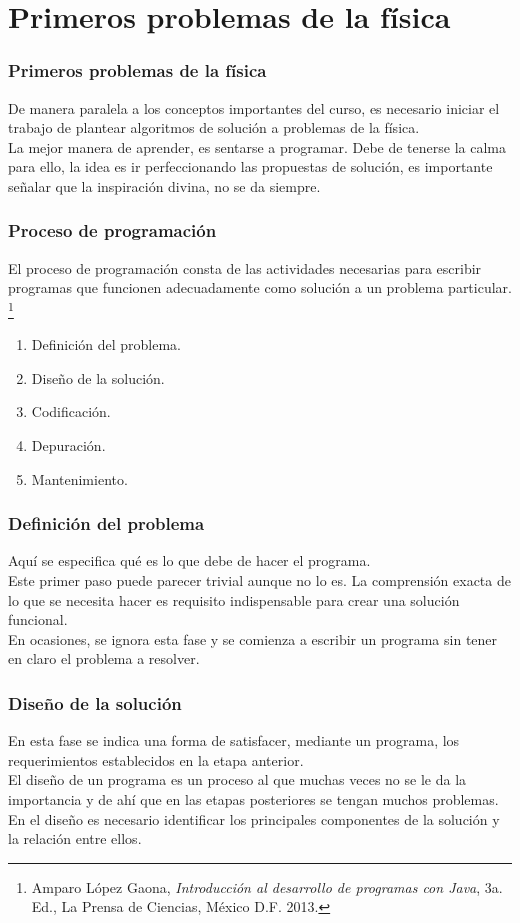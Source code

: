 \section{Primeros problemas de la física}
\begin{frame}
\frametitle{Primeros problemas de la física}
De manera paralela a los conceptos importantes del curso, es necesario iniciar el trabajo de plantear algoritmos de solución a problemas de la física.
\\
\medskip
La mejor manera de aprender, es sentarse a programar. Debe de tenerse la calma para ello, la idea es ir perfeccionando las propuestas de solución, es importante señalar que la inspiración divina, no se da siempre.
\end{frame}
\begin{frame}[fragile]
\frametitle{Proceso de programación}
El proceso de programación consta de las actividades necesarias para escribir programas que funcionen adecuadamente como solución a un problema particular. \footnote{Amparo López Gaona, \textit{Introducción al desarrollo de programas con Java}, 3a. Ed., La Prensa de Ciencias, México D.F. 2013.}
\begin{enumerate}[<+->]
\item Definición del problema.
\item Diseño de la solución.
\item Codificación.
\item Depuración.
\item Mantenimiento.
\end{enumerate}
\end{frame}
\begin{frame}
\frametitle{Definición del problema}
Aquí se especifica qué es lo que debe de hacer el programa.
\\
\bigskip
Este primer paso puede parecer trivial aunque no lo es. La comprensión exacta de lo que se necesita hacer es requisito indispensable para crear una solución funcional.
\\
\medskip
En ocasiones, se ignora esta fase y se comienza a escribir un programa sin tener en claro el problema a resolver.
\end{frame}
\begin{frame}
\frametitle{Diseño de la solución}
En esta fase se indica una forma de satisfacer, mediante un programa, los requerimientos establecidos en la etapa anterior.
\\
\bigskip
El diseño de un programa es un proceso al que muchas veces no se le da la importancia y de ahí que en las etapas posteriores se tengan muchos problemas.
\\
\medskip
En el diseño es necesario identificar los principales componentes de la solución y la relación entre ellos.
\end{frame}
